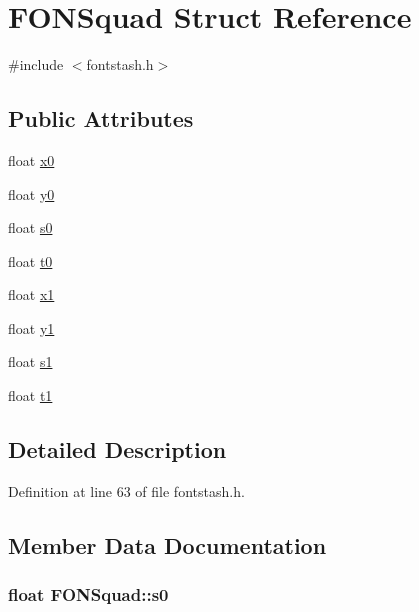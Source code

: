 \hypertarget{struct_f_o_n_squad}{\section{F\+O\+N\+Squad Struct Reference}
\label{struct_f_o_n_squad}
}


{\ttfamily \#include $<$fontstash.\+h$>$}

\subsection*{Public Attributes}
\begin{DoxyCompactItemize}
\item 
float \hyperlink{struct_f_o_n_squad_a3afad57cffbd1350a09f208c631a9813}{x0}
\item 
float \hyperlink{struct_f_o_n_squad_af92a5d58d387d08575a149b3869ad994}{y0}
\item 
float \hyperlink{struct_f_o_n_squad_a3adfc2773c508cc686564474faa32491}{s0}
\item 
float \hyperlink{struct_f_o_n_squad_ab9a0182a9c2d25c165f11fffeb56b130}{t0}
\item 
float \hyperlink{struct_f_o_n_squad_a6db320ddee76b1f2fefcb2c6b31b525d}{x1}
\item 
float \hyperlink{struct_f_o_n_squad_a7d11aed083800fc600fa2b736c7eb973}{y1}
\item 
float \hyperlink{struct_f_o_n_squad_a25bd9940964ba17228ad1eea3f305c46}{s1}
\item 
float \hyperlink{struct_f_o_n_squad_ab3c79f5439b37cf9c1eafa6d4f623ad9}{t1}
\end{DoxyCompactItemize}


\subsection{Detailed Description}


Definition at line 63 of file fontstash.\+h.



\subsection{Member Data Documentation}
\hypertarget{struct_f_o_n_squad_a3adfc2773c508cc686564474faa32491}{
\subsubsection[{s0}]{\setlength{\rightskip}{0pt plus 5cm}float F\+O\+N\+Squad\+::s0}}\label{struct_f_o_n_squad_a3adfc2773c508cc686564474faa32491}


